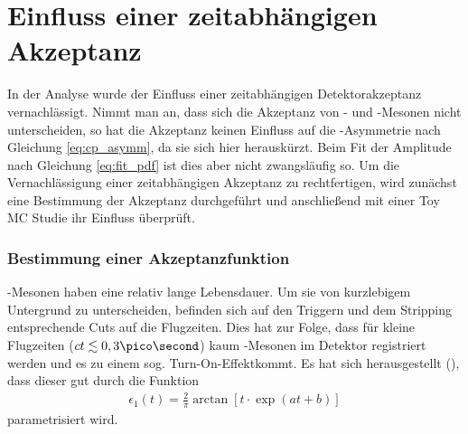 \section{Einfluss einer zeitabhängigen Akzeptanz} \label{kap:akzeptanz}
In der Analyse wurde der Einfluss einer zeitabhängigen Detektorakzeptanz vernachlässigt. Nimmt man an, dass sich die Akzeptanz von \Bd- und \Bdbar-Mesonen nicht unterscheiden, so hat die Akzeptanz keinen Einfluss auf die \CP-Asymmetrie nach Gleichung \ref{eq:cp_asymm}, da sie sich hier herauskürzt. Beim Fit der Amplitude nach Gleichung \ref{eq:fit_pdf} ist dies aber nicht zwangsläufig so. Um die Vernachlässigung einer zeitabhängigen Akzeptanz zu rechtfertigen, wird zunächst eine Bestimmung der Akzeptanz durchgeführt und anschließend mit einer Toy MC Studie ihr Einfluss überprüft.

\subsubsection{Bestimmung einer Akzeptanzfunktion} 
\Bd-Mesonen haben eine relativ lange Lebensdauer. Um sie von kurzlebigem Untergrund zu unterscheiden, befinden sich auf den Triggern und dem Stripping entsprechende Cuts auf die Flugzeiten. Dies hat zur Folge, dass für kleine Flugzeiten ($ct \lesssim 0,3\pico\second$) kaum \Bd-Mesonen im Detektor registriert werden und es zu einem sog. \glqq Turn-On-Effekt\grqq kommt. Es hat sich herausgestellt (\cite{lhcb-paper}), dass dieser gut durch die Funktion
\begin{align}
\epsilon_1(t) = \frac{2}{\pi}\arctan[t\cdot \exp(at+b)]
\end{align}
parametrisiert wird.

